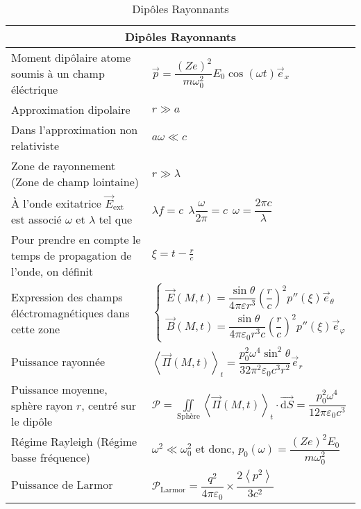 \documentclass[10pt,a4paper,titlepage,landscape]{article}
\renewcommand{\d}
{
    \mathrm{d}
}
\renewcommand{\arraystretch}{2}
\newcommand{\av}[2]
{
    \left\langle#1\right\rangle_{#2}
}
\begin{document}
\begin{table}[H]
    \centering
    \renewcommand{\arraystretch}{1.5} %
    \setlength{\tabcolsep}{8pt} %
    \begin{tabular}{@{}|p{9cm}|p{10cm}@{}|}

        \multicolumn{2}{c}{\textbf{Dipôles Rayonnants}} \\ \hline

        Moment dipôlaire atome soumis à un champ éléctrique & $\vec p = \dfrac{(Ze)^2}{m\omega_0^2}E_0\cos(\omega t)\vec e_x$ \\ \hline
        Approximation dipolaire & $r \gg a$ \\ \hline 
        Dans l'approximation non relativiste & $a\omega \ll c$ \\ \hline
        Zone de rayonnement (Zone de champ lointaine) & $r \gg \lambda$ \\ \hline
        À l'onde exitatrice $\vec E_{\text{ext}}$ est associé $\omega$ et $\lambda$ tel que & $\lambda f = c \ \ \lambda\dfrac{\omega}{2\pi} = c \ \ \omega = \dfrac{2\pi c}{\lambda}$ \\ \hline
        Pour prendre en compte le temps de propagation de l'onde, on définit & $\xi = t - \frac{r}{c}$ \\ \hline
        Expression des champs éléctromagnétiques dans cette zone & $\left\{ \begin{array}{l} \vec E (M,t) = \dfrac{\sin \theta}{4\pi \varepsilon r^3} \left(\dfrac{r}{c}\right)^2 p''(\xi)\vec e_{\theta} \\ \hline \vec B (M,t) = \dfrac{\sin \theta}{4\pi \varepsilon_0 r^3 c}\left(\dfrac{r}{c}\right)^2 p''(\xi) \vec e_{\varphi}\end{array}\right.$ \\ \hline
        Puissance rayonnée & $\av{\vec{\Pi} (M,t)}{t} = \dfrac{p_0^2 \omega^4 \sin^2 \theta}{32 \pi^2 \varepsilon_0 c^3 r^2}\vec e_r$ \\ \hline
        Puissance moyenne, sphère rayon $r$, centré sur le dipôle & $\displaystyle \mathcal{P} = \iint\limits_{\text{Sphère}} \av{\vec \Pi (M,t)}{t} \cdot \vec{\d S} = \dfrac{p_0^2 \omega^4}{12\pi \varepsilon_0 c^3}$ \\ \hline
        Régime Rayleigh (Régime basse fréquence) & $\omega^2 \ll \omega_0^2$ et donc, $p_0(\omega) = \dfrac{(Ze)^2E_0}{m\omega_0^2}$ \\ \hline
        Puissance de Larmor & $\mathcal P_{\text{Larmor}} = \dfrac{q^2}{4\pi \varepsilon_0} \times \dfrac{2\av{p^2}{}}{3c^2}$ \\ \hline


    \end{tabular}
\caption{Dipôles Rayonnants}
\label{tab:der}
\end{table}
\end{document}
